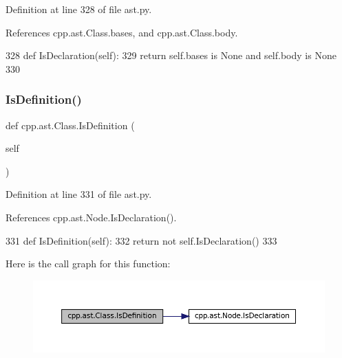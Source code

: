 Definition at line 328 of file ast.\+py.



References cpp.\+ast.\+Class.\+bases, and cpp.\+ast.\+Class.\+body.


\begin{DoxyCode}
328     \textcolor{keyword}{def }IsDeclaration(self):
329         \textcolor{keywordflow}{return} self.bases \textcolor{keywordflow}{is} \textcolor{keywordtype}{None} \textcolor{keywordflow}{and} self.body \textcolor{keywordflow}{is} \textcolor{keywordtype}{None}
330 
\end{DoxyCode}
\mbox{\label{classcpp_1_1ast_1_1Class_ae6d2356f835d06d5109d9e4609d86780}} 
\subsubsection{\texorpdfstring{Is\+Definition()}{IsDefinition()}}
{\footnotesize\ttfamily def cpp.\+ast.\+Class.\+Is\+Definition (\begin{DoxyParamCaption}\item[{}]{self }\end{DoxyParamCaption})}



Definition at line 331 of file ast.\+py.



References cpp.\+ast.\+Node.\+Is\+Declaration().


\begin{DoxyCode}
331     \textcolor{keyword}{def }IsDefinition(self):
332         \textcolor{keywordflow}{return} \textcolor{keywordflow}{not} self.IsDeclaration()
333 
\end{DoxyCode}
Here is the call graph for this function\+:
\nopagebreak
\begin{figure}[H]
\begin{center}
\leavevmode
\includegraphics[width=350pt]{classcpp_1_1ast_1_1Class_ae6d2356f835d06d5109d9e4609d86780_cgraph}
\end{center}
\end{figure}
\mbox{\label{classcpp_1_1ast_1_1Class_a1ab749f8cfddb0903c6484791f70f42e}} 
